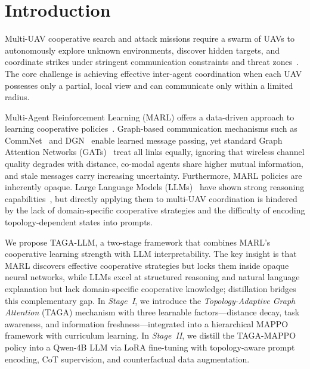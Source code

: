 
\section{Introduction}
\label{sec:intro}

Multi-UAV cooperative search and attack missions require a swarm of UAVs to
autonomously explore unknown environments, discover hidden targets, and
coordinate strikes under stringent communication constraints and threat
zones~\cite{shakhatreh2019unmanned}.  The core challenge is achieving effective
inter-agent coordination when each UAV possesses only a partial, local view and
can communicate only within a limited radius.

Multi-Agent Reinforcement Learning (MARL) offers a data-driven approach to
learning cooperative policies~\cite{lowe2017multi,yu2022surprising}.
Graph-based communication mechanisms such as
CommNet~\cite{sukhbaatar2016learning} and DGN~\cite{jiang2020graph} enable
learned message passing, yet standard Graph Attention Networks
(GATs)~\cite{velickovic2018gat} treat all links equally, ignoring that wireless
channel quality degrades with distance, co-modal agents share higher mutual
information, and stale messages carry increasing uncertainty.  Furthermore, MARL
policies are inherently opaque.  Large Language Models
(LLMs)~\cite{brown2020language} have shown strong reasoning
capabilities~\cite{yao2023react,shinn2023reflexion}, but directly applying them
to multi-UAV coordination is hindered by the lack of domain-specific
cooperative strategies and the difficulty of encoding topology-dependent states
into prompts.

We propose TAGA-LLM, a two-stage framework that combines MARL's
cooperative learning strength with LLM interpretability.  The key insight is
that MARL discovers effective cooperative strategies but locks them inside
opaque neural networks, while LLMs excel at structured reasoning and natural
language explanation but lack domain-specific cooperative knowledge;
distillation bridges this complementary gap.  In \emph{Stage~I}, we introduce the
\emph{Topology-Adaptive Graph Attention} (TAGA) mechanism with three learnable
factors---distance decay, task awareness, and information freshness---integrated
into a hierarchical MAPPO framework with curriculum learning.  In
\emph{Stage~II}, we distill the TAGA-MAPPO policy into a Qwen-4B LLM via LoRA
fine-tuning with topology-aware prompt encoding, CoT supervision, and
counterfactual data augmentation.

